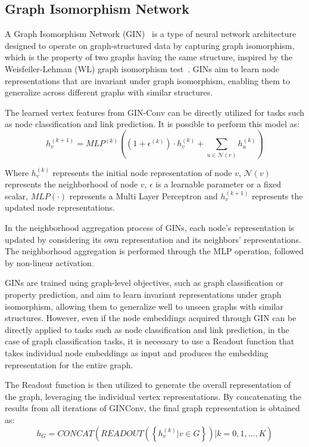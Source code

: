 \subsection{Graph Isomorphism Network}
\label{subsec:graph_isomorphism_network}%

A Graph Isomorphism Network (GIN)~\cite{xu2019powerful, daigavane2021understanding} is a type of neural network architecture designed to operate on graph-structured data by capturing graph isomorphism, which is the property of two graphs having the same structure, inspired by the Weisfeiler-Lehman (WL) graph isomorphism test~\cite{xu2019powerful}.
GINs aim to learn node representations that are invariant under graph isomorphism, enabling them to generalize across different graphs with similar structures.

The learned vertex features from GIN-Conv can be directly utilized for tasks such as node classification and link prediction. It is possible to perform this model as:
\begin{equation}
    \label{eq:gin_function}
    h_v^{(k+1)} = MLP^{(k)} \left( \left( 1 + \epsilon^{(k)} \right) \cdot h_v^{(k)} + \sum_{u \in \mathcal{N}(v)} h_u^{(k)} \right)
\end{equation}

Where $h_v^{(k)}$ represents the initial node representation of node $v$, $\mathcal{N}(v)$ represents the neighborhood of node $v$, $\epsilon$ is a learnable
parameter or a fixed scalar, $MLP( \cdot )$ represents a Multi Layer Perceptron and $h_v^{(k+1)}$ represents the updated node representations.

In the neighborhood aggregation process of GINs, each node's representation is updated by considering its own representation and its neighbors' representations.
The neighborhood aggregation is performed through the MLP operation, followed by non-linear activation.

GINs are trained using graph-level objectives, such as graph classification or property prediction, and aim to learn invariant representations under graph isomorphism, allowing them to generalize well to unseen graphs with similar structures.
However, even if the node embeddings acquired through GIN can be directly applied to tasks such as node classification and link prediction, in the case of graph classification tasks, it is necessary to use a Readout function that takes individual node embeddings as input and produces the embedding representation for the entire graph.

The Readout function is then utilized to generate the overall representation of the graph, leveraging the individual vertex representations.
By concatenating the results from all iterations of GINConv, the final graph representation is obtained as:
\begin{equation}
    \label{eq:gin_readout}
    h_G = CONCAT \left( READOUT \left( \left\{ h_v^{(k)} | v \in G \right\} \right) | k = 0, 1, ..., K \right)
\end{equation}

